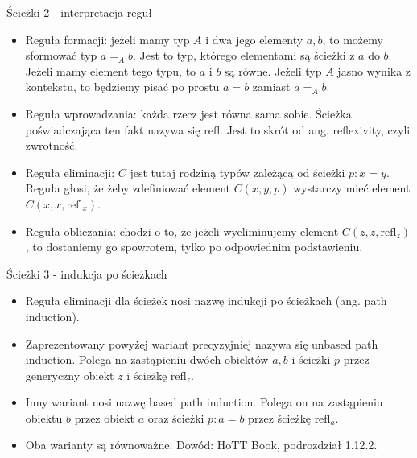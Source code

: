 \documentclass{beamer}
\newcommand{\refl}[1]{\text{refl}_{#1}}
\begin{document}
\begin{frame}{Ścieżki 2 - interpretacja reguł}
\begin{itemize}
	\item Reguła formacji: jeżeli mamy typ $A$ i dwa jego elementy $a, b$, to możemy sformować typ $a =_A b$. Jest to typ, którego elementami są ścieżki z $a$ do $b$. Jeżeli mamy element tego typu, to $a$ i $b$ są równe. Jeżeli typ $A$ jasno wynika z kontekstu, to będziemy pisać po prostu $a = b$ zamiast $a =_A b$.
	\item Reguła wprowadzania: każda rzecz jest równa sama sobie. Ścieżka poświadczająca ten fakt nazywa się $\text{refl}$. Jest to skrót od ang. reflexivity, czyli zwrotność.
	\item Reguła eliminacji: $C$ jest tutaj rodziną typów zależącą od ścieżki $p : x = y$. Reguła głosi, że żeby zdefiniować element $C(x, y, p)$ wystarczy mieć element $C(x, x, \refl{x})$.
	\item Reguła obliczania: chodzi o to, że jeżeli wyeliminujemy element $C(z, z, \refl{z})$, to dostaniemy go spowrotem, tylko po odpowiednim podstawieniu.
\end{itemize}
\end{frame}

\begin{frame}{Ścieżki 3 - indukcja po ścieżkach}
\begin{itemize}
	\item Reguła eliminacji dla ścieżek nosi nazwę indukcji po ścieżkach (ang. path induction).
	\item Zaprezentowany powyżej wariant precyzyjniej nazywa się unbased path induction. Polega na zastąpieniu dwóch obiektów $a, b$ i ścieżki $p$ przez generyczny obiekt $z$ i ścieżkę $\refl{z}$.
	\item Inny wariant nosi nazwę based path induction. Polega on na zastąpieniu obiektu $b$ przez obiekt $a$ oraz ścieżki $p : a = b$ przez ścieżkę $\refl{a}$.
	\item Oba warianty są równoważne. Dowód: HoTT Book, podrozdział 1.12.2.
\end{itemize}
\end{frame}
\end{document}
